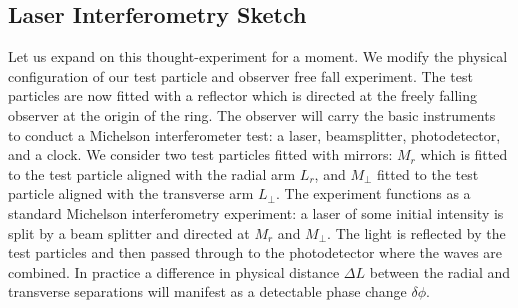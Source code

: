 \documentclass[11pt]{article}
\begin{document}
\subsection{Laser Interferometry Sketch}

Let us expand on this thought-experiment for a moment. We modify the physical configuration of our test particle and observer free fall experiment. The test particles are now fitted with a reflector which is directed at the freely falling observer at the origin of the ring. The observer will carry the basic instruments to conduct a Michelson interferometer test: a laser, beamsplitter, photodetector, and a clock. We consider two test particles fitted with mirrors: $M_r$ which is fitted to the test particle aligned with the radial arm $L_r$, and $M_\perp$ fitted to the test particle aligned with the transverse arm $L_\perp$. The experiment functions as a standard Michelson interferometry experiment: a laser of some initial intensity is split by a beam splitter and directed at $M_r$ and $M_\perp$. The light is reflected by the test particles and then passed through to the photodetector where the waves are combined. In practice a difference in physical distance $\Delta L$ between the radial and transverse separations will manifest as a detectable phase change $\delta \phi$.
\end{document}
